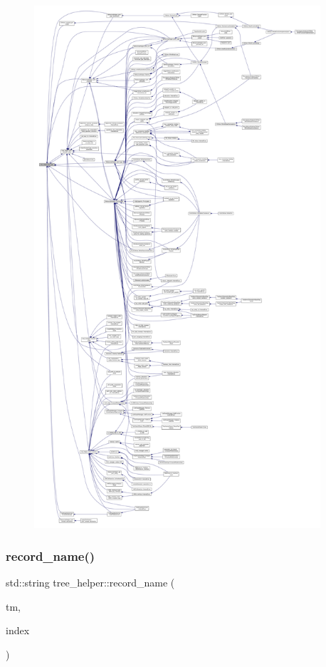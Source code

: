 \begin{figure}[H]
\begin{center}
\leavevmode
\includegraphics[height=550pt]{d7/d99/classtree__helper_ae3199a84c9560139e1bbbaf3b5b1e519_icgraph}
\end{center}
\end{figure}
\mbox{\label{classtree__helper_a320dc61da70090a5f995c49625c1dcca}} 
\subsubsection{\texorpdfstring{record\+\_\+name()}{record\_name()}}
{\footnotesize\ttfamily std\+::string tree\+\_\+helper\+::record\+\_\+name (\begin{DoxyParamCaption}\item[{const \hyperlink{tree__manager_8hpp_a792e3f1f892d7d997a8d8a4a12e39346}{tree\+\_\+manager\+Const\+Ref}}]{tm,  }\item[{unsigned int}]{index }\end{DoxyParamCaption})\hspace{0.3cm}{\ttfamily [static]}}




